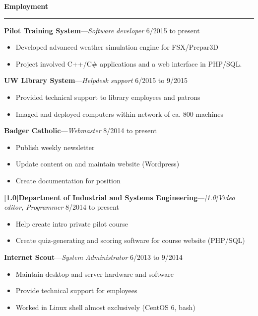 \documentclass[12pt,letterpaper]{article}
\newenvironment{details}{
    \vspace{-.5em}
    \begin{itemize}
        \renewcommand \labelitemi{\labelitemiv}
        \setlength{\itemsep}{0pt}
        \setlength{\parskip}{-1pt}
        \setlength{\parsep}{0pt}
    }{
    \end{itemize}
    \vspace{-.5em}
}
\newcommand{\hr} {
    \vspace{-1em}
    \par\rule{\textwidth}{1pt}
    \vspace{-1.5em}
}
\newcommand{\ressection}[1] {
    \par{\large \textbf{#1}}
    \hr
}
\newenvironment{employment} {
    \setlength{\parskip}{0pt}
    \ressection{Employment}
}{
    \vspace{0.5em}
}
\newcommand{\employer}[3] {
    \vspace{3pt}
    {\par\textbf{#1}---\textit{#2} \hfill #3}
    \par
}
\begin{document}
\begin{employment} 

\employer{Pilot Training System}{Software developer}{6/2015 to present}
\begin{details}
    \item Developed advanced weather simulation engine for FSX/Prepar3D
    \item Project involved C++/C\# applications and a web interface in PHP/SQL.
\end{details}

\employer{UW Library System}{Helpdesk support}{6/2015 to 9/2015}
\begin{details}
    \item Provided technical support to library employees and patrons
    \item Imaged and deployed computers within network of ca. 800 machines
\end{details}

\employer{Badger Catholic}{Webmaster}{8/2014 to present}
\begin{details}
    \item Publish weekly newsletter
    \item Update content on and maintain website (Wordpress)
    \item Create documentation for position
\end{details}

\employer{\scalebox{.8}[1.0]{Department of Industrial and Systems Engineering}}{\scalebox{.9}[1.0]{Video editor, Programmer}}{8/2014 to present}
\begin{details}
    \item Help create intro private pilot course
    \item Create quiz-generating and scoring software for course website (PHP/SQL)
\end{details}

\employer{Internet Scout}{System Administrator}{6/2013 to 9/2014}
\begin{details}
    \item Maintain desktop and server hardware and software
    \item Provide technical support for employees
    \item Worked in Linux shell almost exclusively (CentOS 6, bash)
\end{details}

\end{employment}
\end{document}
